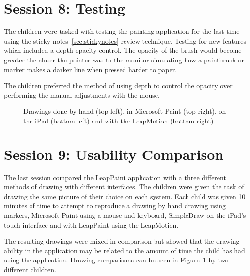 \section{Session 8: Testing}\label{session8}

The children were tasked with testing the painting application for the last time using the sticky notes~\ref{sec:stickynotes} review technique. Testing for new features which included a depth opacity control. The opacity of the brush would become greater the closer the pointer was to the monitor simulating how a paintbrush or marker makes a darker line when pressed harder to paper. 

The children preferred the method of using depth to control the opacity over performing the manual adjustments with the mouse. 
\begin{figure}
\centering     %
{}
\caption{Drawings done by hand (top left), in Microsoft Paint (top right), on the iPad (bottom left) and with the LeapMotion (bottom right)}
\label{fig:comparisondrawing}
\end{figure}

\section{Session 9: Usability Comparison}\label{session9}
The last session compared the LeapPaint application with a three different methods of drawing with different interfaces. The children were given the task of drawing the same picture of their choice on each system. Each child was given 10 minutes of time to attempt to reproduce a drawing by hand drawing using markers, Microsoft Paint using a mouse and keyboard, SimpleDraw on the iPad's touch interface and with LeapPaint using the LeapMotion. 

The resulting drawings were mixed in comparison but showed that the drawing ability in the application may be related to the amount of time the child has had using the application. Drawing comparisons can be seen in Figure~\ref{fig:comparisondrawing} by two different children. 



